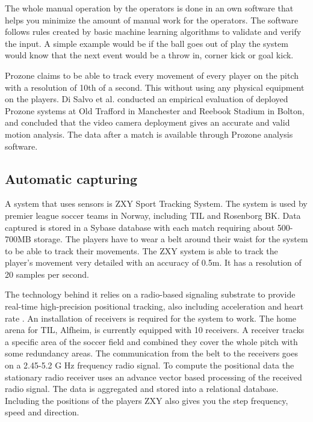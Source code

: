 The whole manual operation by the operators is done in an own software that helps you minimize the amount of manual work for the operators. The software follows rules created by basic machine learning algorithms to validate and verify the input. A simple example would be if the ball goes out of play the system would know that the next event would be a throw in, corner kick or goal kick.

Prozone claims to be able to track every movement of every player on the pitch with a resolution of 10th of a second. This without using any physical equipment on the players. Di Salvo et al. \cite{Prozone:validation} conducted an empirical evaluation of deployed Prozone systems at Old Trafford in Manchester and Reebook Stadium in Bolton, and concluded that the video camera deployment gives an accurate and valid motion analysis. The data after a match is available through Prozone analysis software. 

\subsection{Automatic capturing}

A system that uses sensors is \ac{ZXY} Sport Tracking System. The system is used by premier league soccer teams in Norway, including \ac{TIL} and Rosenborg BK. Data captured is stored in a Sybase database with each match requiring about 500-700MB storage. The players have to wear a belt around their waist for the system to be able to track their movements. The ZXY system is able to track the player’s movement very detailed with an accuracy of 0.5m. It has a resolution of 20 samples per second. 

The technology behind it relies on a radio-based signaling substrate to provide real-time high-precision positional tracking, also including acceleration and heart rate \cite{PTW}. An installation of receivers is required for the system to work. The home arena for \ac{TIL}, Alfheim, is currently equipped with 10 receivers. A receiver tracks a specific area of the soccer field and combined they cover the whole pitch with some redundancy areas. The communication from the belt to the receivers goes on a 2.45-5.2 G Hz frequency radio signal. To compute the positional data the stationary radio receiver uses an advance vector based processing of the received radio signal. The data is aggregated and stored into a relational database. Including the positions of the players ZXY also gives you the step frequency, speed and direction.

